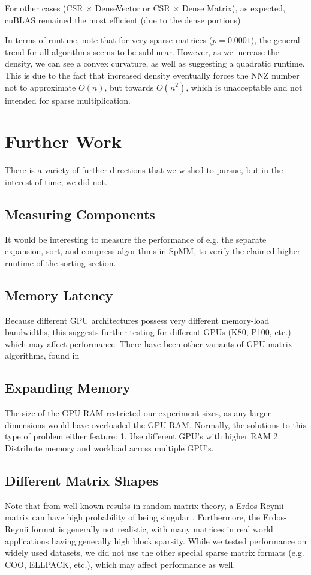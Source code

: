 \documentclass[12pt]{article}
\begin{document}
For other cases (CSR $\times$ DenseVector or CSR $\times$ Dense Matrix), as expected, cuBLAS remained the most efficient (due to the dense portions)

In terms of runtime, note that for very sparse matrices ($p = 0.0001$), the general trend for all algorithms seems to be sublinear. However, as we increase the density, we can see a convex curvature, as well as suggesting a quadratic runtime. This is due to the fact that increased density eventually forces the NNZ number not to approximate $O(n)$, but towards $O(n^{2})$, which is unacceptable and not intended for sparse multiplication. 

\section{Further Work}
There is a variety of further directions that we wished to pursue, but in the interest of time, we did not. 
\subsection{Measuring Components}
It would be interesting to measure the performance of e.g. the separate expansion, sort, and compress algorithms in SpMM, to verify the claimed higher runtime of the sorting section.

\subsection{Memory Latency}
Because different GPU architectures possess very different memory-load bandwidths, this suggests further testing for different GPUs (K80, P100, etc.) which may affect performance. There have been other variants of GPU matrix algorithms, found in 

\subsection{Expanding Memory}
The size of the GPU RAM restricted our experiment sizes, as any larger dimensions would have overloaded the GPU RAM. Normally, the solutions to this type of problem either feature: 1. Use different GPU's with higher RAM 2. Distribute memory and workload across multiple GPU's.

\subsection{Different Matrix Shapes}
Note that from well known results in random matrix theory, a Erdos-Reynii matrix can have high probability of being singular \cite{singular}. Furthermore, the Erdos-Reynii format is generally not realistic, with many matrices in real world applications having generally high block sparsity. While we tested performance on widely used datasets, we did not use the other special sparse matrix formats (e.g. COO, ELLPACK, etc.), which may affect performance as well.   
\end{document}
